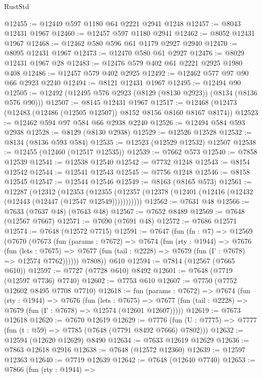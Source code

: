 \begin{lexlean}{RustStd}
\begin{coremodule}
{\begin{coremodule}
{{{{{{{{{{{{{{{{{{{{{{{{{{{{{{{{{{{{{{{{{{{{{{{{{{{{{@12455 := @12449 @597 @1180 @64 @2221 @2941 @1248
@12457 := @8043 @12431 @1967
@12460 := @12457 @597 @1180 @2941
@12462 := @8052 @12431 @1967
@12468 := @12462 @580 @596 @61 @1179 @2927 @2940
@12470 := @8095 @12431 @1967
@12473 := @12470 @580 @61 @2927
@12476 := @8029 @12431 @1967 @28
@12483 := @12476 @579 @402 @61 @2221 @2925 @1980 @408
@12486 := @12457 @579 @402 @2925
@12492 := @12462 @577 @97 @90 @66 @2923 @2240
@12494 := @8121 @12431 @1967
@12495 := @12494 @90
@12505 := @12492 (@12495 @576 @2923 (@8129 (@8130 @2923)) (@8134 (@8136 @576 @90)))
@12507 := @8145 @12431 @1967
@12517 := @12468 (@12473 (@12483 (@12486 (@12505 @12507)) @8152 @8156 @8160 @8167 @8174))
@12523 := @12462 @594 @97 @584 @66 @2938 @2240
@12526 := @12494 @584 @593 @2938
@12528 := @8129 (@8130 @2938)
@12529 := @12526 @12528
@12532 := @8134 (@8136 @593 @584)
@12535 := @12523 (@12529 @12532) @12507
@12538 := @12455 (@12460 (@12517 @12535))
@12539 := @7662 @573
@12540 := @7858 @12539
@12541 := @12538 @12540
@12542 := @7732 @1248
@12543 := @8154 @12542
@12544 := @12541 @12543
@12545 := @7756 @1248
@12546 := @8158 @12545
@12547 := @12544 @12546
@12549 := @8163 (@8165 @573)
@12561 := @12287
    (@12312
      (@12353
        (@12355 (@12357 (@12378 (@12401 (@12416 (@12432 (@12443 (@12447 (@12547 @12549)))))))))))
@12562 := @7631 @48
@12566 := @7633 (@7637 @48) (@7643 @48)
@12567 := @7652 @8489
@12569 := @7648 (@12567 @7667)
@12571 := @7690 (@7691 @48)
@12572 := @7686 @12571
@12574 := @7648 (@12572 @7715)
@12591 := @7647
    (fun (fn : @7) =>
    @12569
      (@7670
        (@7673
          (fun (params : @7672) =>
          @7674
            (fun (rty : @1944) =>
            @7676
              (fun (lets : @7675) =>
              @7677 (fun (tail : @2228) => @7679 (fun (Γ : @7678) => @12574 @7762))))))
        @7808))
    @610
@12594 := @7814 (@12567 (@7665 @610))
@12597 := @7727 (@7728 @610) @8492
@12601 := @7648 (@7719 (@12597 @7736) @7740)
@12602 := @7753 @610
@12607 := @7750 (@7752 @12602 @8495 @7708 @7710)
@12618 := fun (params : @7672) =>
  @7674
    (fun (rty : @1944) =>
    @7676
      (fun (lets : @7675) =>
      @7677 (fun (tail : @2228) => @7679 (fun (Γ : @7678) => @12574 (@12601 @12607)))))
@12619 := @7673 @12618
@12620 := @7670 @12619
@12629 := @7776
    (fun (U : @7775) => @7777 (fun (t : @59) => @7785 (@7648 (@7791 @8492 @7666) @7802)))
@12632 := @12594 (@12620 @12629) @8490
@12634 := @7633 @12619 @12629
@12636 := @7863 @12618 @2916
@12638 := @7648 (@12572 @12360)
@12639 := @12597 @12363
@12640 := @7719 @12639
@12642 := @7648 (@12640 @7740)
@12653 := @7866
    (fun (rty : @1944) =>
}}}}}}}}}}}}}}}}}}}}}}}}}}}}}}}}}}}}}}}}}}}}}}}}}}}}}
\end{coremodule}}
\end{coremodule}
\end{lexlean}
